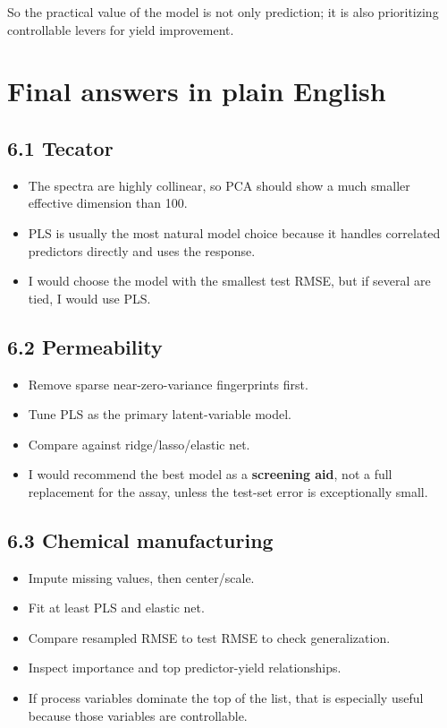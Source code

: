 \documentclass[
  11pt,
]{article}
\providecommand{\tightlist}{%
  \setlength{\itemsep}{0pt}\setlength{\parskip}{0pt}}
\begin{document}
So the practical value of the model is not only prediction; it is also
prioritizing controllable levers for yield improvement.

\section{Final answers in plain
English}\label{final-answers-in-plain-english}

\subsection{6.1 Tecator}\label{tecator}

\begin{itemize}
\tightlist
\item
  The spectra are highly collinear, so PCA should show a much smaller
  effective dimension than 100.
\item
  PLS is usually the most natural model choice because it handles
  correlated predictors directly and uses the response.
\item
  I would choose the model with the smallest test RMSE, but if several
  are tied, I would use PLS.
\end{itemize}

\subsection{6.2 Permeability}\label{permeability-1}

\begin{itemize}
\tightlist
\item
  Remove sparse near-zero-variance fingerprints first.
\item
  Tune PLS as the primary latent-variable model.
\item
  Compare against ridge/lasso/elastic net.
\item
  I would recommend the best model as a \textbf{screening aid}, not a
  full replacement for the assay, unless the test-set error is
  exceptionally small.
\end{itemize}

\subsection{6.3 Chemical manufacturing}\label{chemical-manufacturing}

\begin{itemize}
\tightlist
\item
  Impute missing values, then center/scale.
\item
  Fit at least PLS and elastic net.
\item
  Compare resampled RMSE to test RMSE to check generalization.
\item
  Inspect importance and top predictor-yield relationships.
\item
  If process variables dominate the top of the list, that is especially
  useful because those variables are controllable.
\end{itemize}
\end{document}
